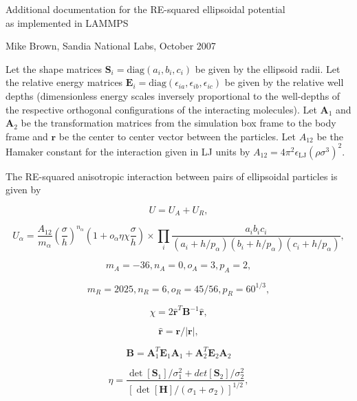 


\begin{center}

\large{Additional documentation for the RE-squared ellipsoidal potential \\
  as implemented in LAMMPS}

\end{center}

\centerline{Mike Brown, Sandia National Labs, October 2007}

\vspace{0.3in}

Let the shape matrices $\mathbf{S}_i=\mbox{diag}(a_i, b_i, c_i)$ be 
given by the ellipsoid radii. Let the relative energy matrices 
$\mathbf{E}_i = \mbox{diag} (\epsilon_{ia}, \epsilon_{ib}, 
\epsilon_{ic})$ be given by the relative well depths 
(dimensionless energy scales inversely proportional to the well-depths 
of the respective orthogonal configurations of the interacting molecules).
Let $\mathbf{A}_1$ and $\mathbf{A}_2$ be the transformation matrices 
from the simulation box frame to the body frame and $\mathbf{r}$ 
be the center to center vector between the particles. Let $A_{12}$ be 
the Hamaker constant for the interaction given in LJ units by
$A_{12}=4\pi^2\epsilon_{\mathrm{LJ}}(\rho\sigma^3)^2$.
 
\vspace{0.3in}

The RE-squared anisotropic interaction between pairs of 
ellipsoidal particles is given by

$$ U=U_A+U_R, $$

$$ U_\alpha=\frac{A_{12}}{m_\alpha}(\frac\sigma{h})^{n_\alpha}
(1+o_\alpha\eta\chi\frac\sigma{h}) \times \prod_i{
\frac{a_ib_ic_i}{(a_i+h/p_\alpha)(b_i+h/p_\alpha)(c_i+h/p_\alpha)}}, $$

$$ m_A=-36, n_A=0, o_A=3, p_A=2, $$

$$ m_R=2025, n_R=6, o_R=45/56, p_R=60^{1/3}, $$

$$ \chi = 2 \hat{\mathbf{r}}^T \mathbf{B}^{-1}
\hat{\mathbf{r}}, $$

$$ \hat{\mathbf{r}} = { \mathbf{r} } / |\mathbf{r}|, $$

$$ \mathbf{B} = \mathbf{A}_1^T \mathbf{E}_1 \mathbf{A}_1 +
\mathbf{A}_2^T \mathbf{E}_2 \mathbf{A}_2 $$

$$ \eta = \frac{ \det[\mathbf{S}_1]/\sigma_1^2+
det[\mathbf{S}_2]/\sigma_2^2}{[\det[\mathbf{H}]/
(\sigma_1+\sigma_2)]^{1/2}}, $$

